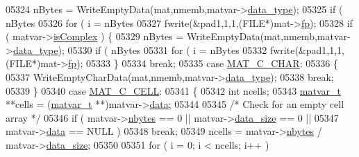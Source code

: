 \begin{DoxyCode}
{{{{{{{{{{{{{{{{{{{{{{{{{{{{{{{05324                 nBytes = WriteEmptyData(mat,nmemb,matvar->\hyperlink{group___m_a_t_ab6aafe9bd77f0f077852593dec438144}{data\_type});
05325                 \textcolor{keywordflow}{if} ( nBytes %
05326                     \textcolor{keywordflow}{for} ( i = nBytes %
05327                         fwrite(&pad1,1,1,(FILE*)mat->\hyperlink{struct__mat__t_a85f562e407ca9ad4d2a6e14f839432b7}{fp});
05328                 \textcolor{keywordflow}{if} ( matvar->\hyperlink{group___m_a_t_aeb03b3a69f108dc05470b00443a43739}{isComplex} ) \{
05329                     nBytes = WriteEmptyData(mat,nmemb,matvar->\hyperlink{group___m_a_t_ab6aafe9bd77f0f077852593dec438144}{data\_type});
05330                     \textcolor{keywordflow}{if} ( nBytes %
05331                         \textcolor{keywordflow}{for} ( i = nBytes %
05332                             fwrite(&pad1,1,1,(FILE*)mat->\hyperlink{struct__mat__t_a85f562e407ca9ad4d2a6e14f839432b7}{fp});
05333                 \}
05334                 \textcolor{keywordflow}{break};
05335             \textcolor{keywordflow}{case} \hyperlink{group___m_a_t_ggad4d60ae7b709fc81bfd744fb4c857c40aacdec5834df0861130b393697646119c}{MAT\_C\_CHAR}:
05336             \{
05337                 WriteEmptyCharData(mat,nmemb,matvar->\hyperlink{group___m_a_t_ab6aafe9bd77f0f077852593dec438144}{data\_type});
05338                 \textcolor{keywordflow}{break};
05339             \}
05340             \textcolor{keywordflow}{case} \hyperlink{group___m_a_t_ggad4d60ae7b709fc81bfd744fb4c857c40a2f7abb47a1c51e248bd4e5e03cc81b08}{MAT\_C\_CELL}:
05341             \{
05342                 \textcolor{keywordtype}{int}        ncells;
05343                 \hyperlink{group___m_a_t_structmatvar__t}{matvar\_t} **cells = (\hyperlink{group___m_a_t_structmatvar__t}{matvar\_t} **)matvar->\hyperlink{group___m_a_t_a5672978efa230bbdecdf38ede781f7fa}{data};
05344 
05345                 \textcolor{comment}{/* Check for an empty cell array */}
05346                 if ( matvar->\hyperlink{group___m_a_t_abf1c844540503be2df9bb3db93cfe307}{nbytes} == 0 || matvar->\hyperlink{group___m_a_t_a9ad1c82e2b568da617e12dc73a26e1f9}{data\_size} == 0 ||
05347                      matvar->\hyperlink{group___m_a_t_a5672978efa230bbdecdf38ede781f7fa}{data}   == NULL )
05348                     \textcolor{keywordflow}{break};
05349                 ncells = matvar->\hyperlink{group___m_a_t_abf1c844540503be2df9bb3db93cfe307}{nbytes} / matvar->\hyperlink{group___m_a_t_a9ad1c82e2b568da617e12dc73a26e1f9}{data\_size};
05350 
05351                 \textcolor{keywordflow}{for} ( i = 0; i < ncells; i++ )
}}}}}}}}}}}}}}}}}}}}}}}}}}}}}}}
\end{DoxyCode}
